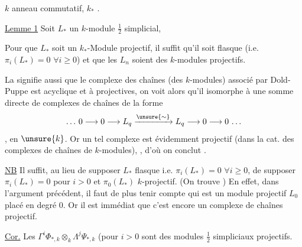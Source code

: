 $k$ anneau commutatif, $k_*$  .

\uline{Lemme 1} Soit $L_*$ un $k$-module $\frac12$ simplicial, 

Pour que $L_*$ soit un $k_*$-Module projectif, il suffit qu'il soit flasque (i.e. $\pi_i(L_*)=0$ $\forall i\geq0$) et que les $L_n$ soient des $k$-modules projectifs.

La  signifie aussi que le complexe des chaînes (des $k$-modules) associé par Dold-Puppe est acyclique et à  projectives, on voit alors qu'il   isomorphe à une somme directe de complexes de chaînes de la forme
\[
\ldots\,0\longrightarrow0\longrightarrow L_q
 \xrightarrow{\unsure{\sim}}L_q\longrightarrow0\longrightarrow0\,\ldots
\]
 , en $\unsure{k}$. Or un tel complexe est évidemment projectif (dans la cat. des complexes de chaînes de $k$-modules), , d'où on conclut .

\uline{NB} Il suffit, au lieu de supposer $L_*$ flasque i.e. $\pi_i(L_*)=0$ $\forall i\geq0$, de supposer $\pi_i(L_*)=0$ pour $i>0$ et $\pi_0(L_*)$ $k$-projectif. (On trouve   ) En effet, dans l'argument précédent, il faut de plus tenir compte  qui est un module projectif $L_0$ placé en degré $0$. Or il est immédiat que c'est encore un complexe de chaînes projectif.

\uline{Cor.} Les $\Gamma^i\Phi_{*,k}\otimes_k\Lambda^j\Psi_{*,k}$  (pour $i>0$ sont des modules $\frac12$ simpliciaux projectifs.

